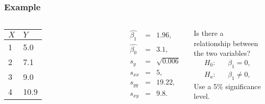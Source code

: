 \begin{frame}
  \frametitle{Example}

    \begin{columns}

      \begin{tabular}{l|l}
        $X$ & $Y$ \\ \hline
        1 & 5.0 \\
        2 & 7.1 \\
        3 & 9.0 \\
        4 & 10.9 \\
      \end{tabular}


      \begin{eqnarray*}
        \hat{\beta_1} & = & 1.96, \\
        \hat{\beta_0} & = & 3.1, \\
        s_y & = & \sqrt{0.006} \\
        s_{xx} & = & 5, \\
        s_{yy} & = & 19.22, \\
        s_{xy} & = & 9.8. 
      \end{eqnarray*}



      Is there a relationship between the two variables?
      \begin{eqnarray*}
        H_0: & & \beta_1=0, \\
        H_a: & & \beta_1\neq 0,        
      \end{eqnarray*}
      Use a 5\% significance level.

    \end{columns}


\end{frame}


